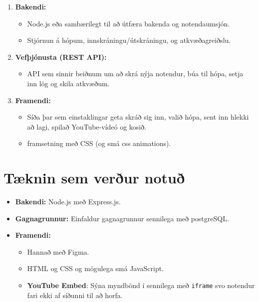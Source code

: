 \documentclass{article}
\begin{document}
\begin{enumerate}[label=\alph*.]
    \item \textbf{Bakendi:}  
        \begin{itemize}
            \item Node.js eða sambærilegt til að útfæra bakenda og notendaumsjón.
            \item Stjórnun á hópum, innskráningu/útskráningu, og atkvæðagreiðslu.
        \end{itemize}
    \item \textbf{Vefþjónusta (REST API):}  
        \begin{itemize}
            \item API sem sinnir beiðnum um að skrá nýja notendur, búa til hópa, setja inn lög og skila atkvæðum.
        \end{itemize}
    \item \textbf{Framendi:}  
        \begin{itemize}
            \item Síða þar sem einstaklingar geta skráð sig inn, valið hópa, sent inn hlekki að lagi, spilað YouTube-vídeó og kosið.
            \item framsetning með CSS (og smá css animations).
        \end{itemize}
\end{enumerate}

\section{Tæknin sem verður notuð}
\begin{itemize}
    \item \textbf{Bakendi:} Node.js með Express.js. 
    \item \textbf{Gagnagrunnur:} Einfaldur gagnagrunnur sennilega með postgreSQL. 
    \item \textbf{Framendi:}  
          \begin{itemize}
            \item Hannað með Figma.
            \item HTML og CSS og mögulega smá JavaScript.
            \item \textbf{YouTube Embed}: Sýna myndbönd í sennilega með \texttt{iframe} svo notendur fari ekki af síðunni til að horfa.
          \end{itemize}
\end{itemize}
\newpage
\end{document}
